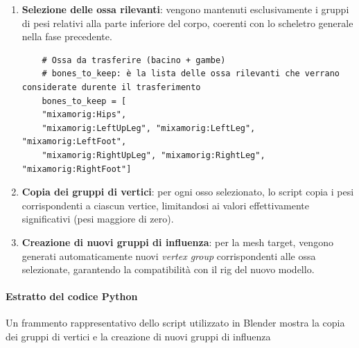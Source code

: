 \begin{enumerate}
    \item \textbf{Selezione delle ossa rilevanti}: vengono mantenuti esclusivamente i gruppi di pesi relativi alla parte inferiore del corpo, coerenti con lo scheletro generale nella fase precedente.
    
    \begin{verbatim}
    # Ossa da trasferire (bacino + gambe)
    # bones_to_keep: è la lista delle ossa rilevanti che verrano considerate durente il trasferimento
    bones_to_keep = [
    "mixamorig:Hips",
    "mixamorig:LeftUpLeg", "mixamorig:LeftLeg", "mixamorig:LeftFoot",
    "mixamorig:RightUpLeg", "mixamorig:RightLeg", "mixamorig:RightFoot"]
    \end{verbatim}

    \item \textbf{Copia dei gruppi di vertici}: per ogni osso selezionato, lo script copia i pesi corrispondenti a ciascun vertice, limitandosi ai valori effettivamente significativi (pesi maggiore di zero).

    \item \textbf{Creazione di nuovi gruppi di influenza}: per la mesh target, vengono generati automaticamente nuovi \textit{vertex group} corrispondenti alle ossa selezionate, garantendo la compatibilità con il rig del nuovo modello.
\end{enumerate}

\paragraph{Estratto del codice Python}

Un frammento rappresentativo dello script utilizzato in Blender mostra la copia dei gruppi di vertici e la creazione di nuovi gruppi di influenza


